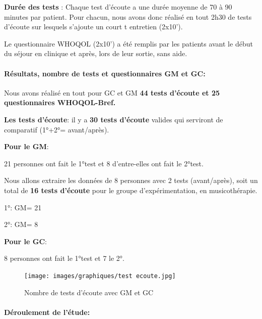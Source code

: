	
	
	\textbf{Durée des tests} : Chaque test d'écoute a une durée  moyenne de
        70 à 90 minutes par patient. Pour chacun, nous avons donc réalisé
        en tout 2h30 de tests d'écoute sur lesquels
        s'ajoute un court 
t        entretien (2x10').

        
        Le questionnaire WHOQOL (2x10')  a été remplis par les
        patients avant le début du séjour en clinique et après, lors
        de leur sortie, sans aide.
        
       





        
      \paragraph{Résultats, nombre de tests et questionnaires GM et GC:}

       
     Nous avons réalisé en tout pour GC et GM \textbf{44 tests d'écoute et 25 questionnaires 
     WHOQOL-Bref.}
     
     \textbf{Les tests d'écoute}: il y a\textbf{ 30 tests d'écoute } valides qui serviront de
     comparatif (1°+2°= avant/après).



     
\textbf{Pour le GM}:
     
     21 personnes ont fait le 1°test et 8 d'entre-elles ont fait le
     2°test.

     Nous allons extraire les données de 8 personnes avec 2 tests (avant/après), soit  un
     total de \textbf{16 tests d'écoute } pour le groupe
     d'expérimentation, en musicothérapie.

     
     1°: GM= 21
    
     2°: GM= 8
     
     \textbf{ Pour le GC}:

     
     8 personnes ont fait le 1°test et 7 le 2°.


     
   \begin{figure}
\centering
\texttt{[image: images/graphiques/test ecoute.jpg]}
\caption[Schéma du déroulement]{Nombre de tests d'écoute avec GM et GC}
       
\label{groupecontroleimage1}
\end{figure}
  
     
\paragraph{Déroulement de l'étude:}


